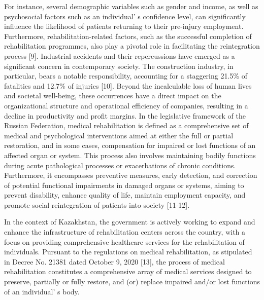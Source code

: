 \begin{multicols}{2}
For instance, several demographic variables such as gender and income,
as well as psychosocial factors such as an individual' s
confidence level, can significantly influence the likelihood of patients
returning to their pre-injury employment. Furthermore,
rehabilitation-related factors, such as the successful completion of
rehabilitation programmes, also play a pivotal role in facilitating the
reintegration process {[}9{]}. Industrial accidents and their
repercussions have emerged as a significant concern in contemporary
society. The construction industry, in particular, bears a notable
responsibility, accounting for a staggering 21.5\% of fatalities and
12.7\% of injuries {[}10{]}. Beyond the incalculable loss of human lives
and societal well-being, these occurrences have a direct impact on the
organizational structure and operational efficiency of companies,
resulting in a decline in productivity and profit margins. In the
legislative framework of the Russian Federation, medical rehabilitation
is defined as a comprehensive set of medical and psychological
interventions aimed at either the full or partial restoration, and in
some cases, compensation for impaired or lost functions of an affected
organ or system. This process also involves maintaining bodily functions
during acute pathological processes or exacerbations of chronic
conditions. Furthermore, it encompasses preventive measures, early
detection, and correction of potential functional impairments in damaged
organs or systems, aiming to prevent disability, enhance quality of
life, maintain employment capacity, and promote social reintegration of
patients into society {[}11-12{]}.

In the context of Kazakhstan, the government is actively working to
expand and enhance the infrastructure of rehabilitation centers across
the country, with a focus on providing comprehensive healthcare services
for the rehabilitation of individuals. Pursuant to the regulations on
medical rehabilitation, as stipulated in Decree No. 21381 dated October
9, 2020 {[}13{]}, the process of medical rehabilitation constitutes a
comprehensive array of medical services designed to preserve, partially
or fully restore, and (or) replace impaired and/or lost functions of an
individual' s body.


\end{multicols}
